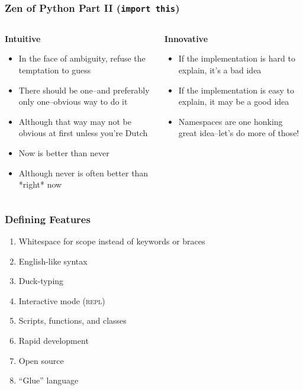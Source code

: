\documentclass{beamer}
\begin{document}
\begin{frame}
  \frametitle{Zen of Python Part II (\texttt{import this})}
  \begin{columns}
  \begin{column}{0.60\textwidth}
    \textbf{Intuitive}
    \begin{itemize}
      \item In the face of ambiguity, refuse the temptation to guess
      \item There should be one--and preferably only one--obvious way to do it
      \item Although that way may not be obvious at first unless you're Dutch
      \item Now is better than never
      \item Although never is often better than *right* now
    \end{itemize}
  \end{column}
  \begin{column}{0.40\textwidth}
    \textbf{Innovative}
    \begin{itemize}
      \item If the implementation is hard to explain, it's a bad idea
      \item If the implementation is easy to explain, it may be a good idea
      \item Namespaces are one honking great idea--let's do more of those!
    \end{itemize}
  \end{column}
 \end{columns}
\end{frame}


\begin{frame}
  \frametitle{Defining Features}
  \begin{enumerate}
    \item Whitespace for scope instead of keywords or braces
    \item English-like syntax
    \item Duck-typing
    \item Interactive mode (\textsc{repl})
    \item Scripts, functions, and classes
    \item Rapid development
    \item Open source
    \item ``Glue'' language
  \end{enumerate}
\end{frame}
\end{document}
